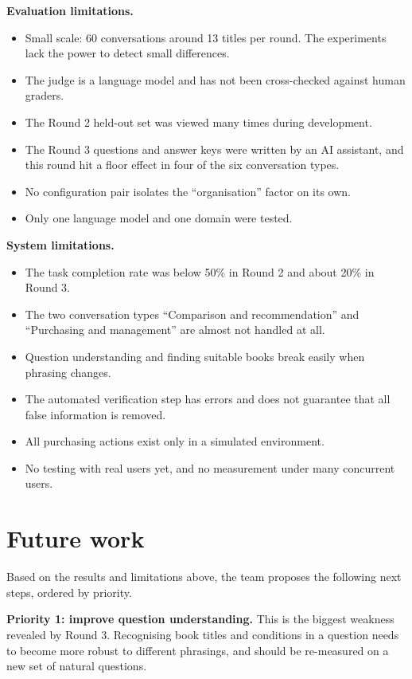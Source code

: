 \textbf{Evaluation limitations.}
\begin{itemize}
    \item Small scale: 60 conversations around 13 titles per round. The experiments lack the power to detect small differences.
    \item The judge is a language model and has not been cross-checked against human graders.
    \item The Round 2 held-out set was viewed many times during development.
    \item The Round 3 questions and answer keys were written by an AI assistant, and this round hit a floor effect in four of the six conversation types.
    \item No configuration pair isolates the ``organisation'' factor on its own.
    \item Only one language model and one domain were tested.
\end{itemize}

\textbf{System limitations.}
\begin{itemize}
    \item The task completion rate was below 50\% in Round 2 and about 20\% in Round 3.
    \item The two conversation types ``Comparison and recommendation'' and ``Purchasing and management'' are almost not handled at all.
    \item Question understanding and finding suitable books break easily when phrasing changes.
    \item The automated verification step has errors and does not guarantee that all false information is removed.
    \item All purchasing actions exist only in a simulated environment.
    \item No testing with real users yet, and no measurement under many concurrent users.
\end{itemize}

\section{Future work}

Based on the results and limitations above, the team proposes the following next steps, ordered by priority.

\textbf{Priority 1: improve question understanding.} This is the biggest weakness revealed by Round 3. Recognising book titles and conditions in a question needs to become more robust to different phrasings, and should be re-measured on a new set of natural questions.

